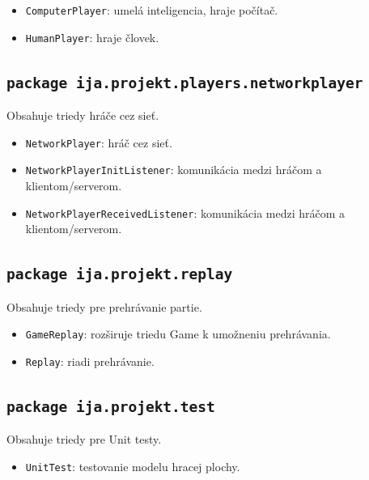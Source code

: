 \documentclass[12pt,a4paper,titlepage,final]{article}
\begin{document}
\begin{itemize}
\item \texttt{ComputerPlayer}: umelá inteligencia, hraje počítač.
\item \texttt{HumanPlayer}: hraje človek.
\end{itemize}

\subsection{\texttt{package ija.projekt.players.networkplayer}}
Obsahuje triedy hráče cez sieť.

\begin{itemize}
\item \texttt{NetworkPlayer}: hráč cez sieť.
\item \texttt{NetworkPlayerInitListener}: komunikácia medzi hráčom a klientom/serverom.
\item \texttt{NetworkPlayerReceivedListener}: komunikácia medzi hráčom a klientom/serverom.
\end{itemize}

\subsection{\texttt{package ija.projekt.replay}}
Obsahuje triedy pre prehrávanie partie.

\begin{itemize}
\item \texttt{GameReplay}: rozširuje triedu Game k umožneniu prehrávania.
\item \texttt{Replay}: riadi prehrávanie.
\end{itemize}

\subsection{\texttt{package ija.projekt.test}}
Obsahuje triedy pre Unit testy.

\begin{itemize}
\item \texttt{UnitTest}: testovanie modelu hracej plochy.
\end{itemize}
\end{document}
